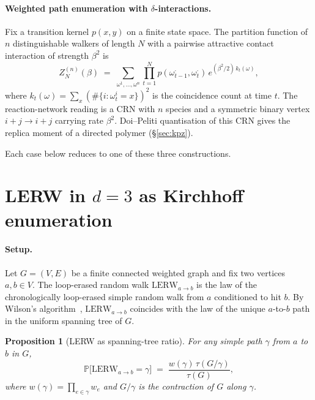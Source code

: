 \documentclass[10pt,a4paper,twocolumn]{article}
\theoremstyle{plain}
\newtheorem{proposition}[theorem]{Proposition}
\theoremstyle{definition}
\newcommand{\Tree}{\tau}
\newcommand{\LERW}{\mathrm{LERW}}
\begin{document}
\paragraph{Weighted path enumeration with $\delta$-interactions.}
Fix a transition kernel $p(x, y)$ on a finite state space.  The
partition function of $n$ distinguishable walkers of length $N$
with a pairwise attractive contact interaction of strength $\beta^2$ is
\begin{equation}
  Z_N^{(n)}(\beta) \;=\; \sum_{\omega^1, \ldots, \omega^n} \prod_{t=1}^N
    p(\omega^{\cdot}_{t-1}, \omega^{\cdot}_t) \,
    e^{(\beta^2/2)\, k_t(\omega)},
  \label{eq:nwalker}
\end{equation}
where $k_t(\omega) = \sum_x (\#\{i : \omega^i_t = x\})^2$ is the
coincidence count at time $t$.  The reaction-network reading is a
CRN with $n$ species and a symmetric binary vertex
$i + j \to i + j$ carrying rate $\beta^2$.  Doi--Peliti quantisation
of this CRN gives the replica moment of a directed polymer
(§\ref{sec:kpz}).

Each case below reduces to one of these three constructions.

\section{LERW in $d = 3$ as Kirchhoff enumeration}
\label{sec:lerw}

\paragraph{Setup.} Let $G = (V, E)$ be a finite connected weighted
graph and fix two vertices $a, b \in V$.  The loop-erased random walk
$\LERW_{a\to b}$ is the law of the chronologically loop-erased
simple random walk from $a$ conditioned to hit $b$.  By Wilson's
algorithm~\citep{Wilson1996}, $\LERW_{a \to b}$ coincides with the law
of the unique $a$-to-$b$ path in the uniform spanning tree of $G$.

\begin{proposition}[LERW as spanning-tree ratio]
\label{prop:lerw}
For any simple path $\gamma$ from $a$ to $b$ in $G$,
\begin{equation}
  \mathbb{P}\bigl[\LERW_{a\to b} = \gamma\bigr]
  \;=\; \frac{w(\gamma) \, \Tree(G / \gamma)}{\Tree(G)},
  \label{eq:lerw-kirchhoff}
\end{equation}
where $w(\gamma) = \prod_{e \in \gamma} w_e$ and $G / \gamma$ is the
contraction of $G$ along $\gamma$.
\end{proposition}
\end{document}
